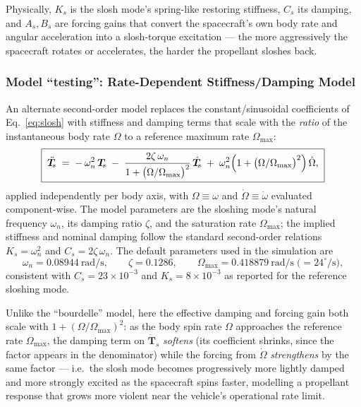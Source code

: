 Physically, $K_s$ is the slosh mode's spring-like restoring stiffness,
$C_s$ its damping, and $A_s, B_s$ are forcing gains that convert the
spacecraft's own body rate and angular acceleration into a slosh-torque
excitation --- the more aggressively the spacecraft rotates or
accelerates, the harder the propellant sloshes back.

\subsubsection{Model ``testing'': Rate-Dependent Stiffness/Damping Model}
\label{sec:slosh-testing}

An alternate second-order model replaces the constant/sinusoidal
coefficients of Eq.~\eqref{eq:slosh} with stiffness and damping terms that
scale with the \emph{ratio} of the instantaneous body rate $\Omega$ to a
reference maximum rate $\Omega_{\max}$:
\begin{equation}
\boxed{\;
\ddot{\bm{T}}_{\!s}
\;=\;
 -\,\omega_n^{2}\,\bm{T}_{\!s}
 \;-\;
 \frac{2\zeta\,\omega_n}{1+\bigl(\Omega/\Omega_{\max}\bigr)^{2}}\,
 \dot{\bm{T}}_{\!s}
 \;+\;
 \omega_n^{2}\Bigl(1+\bigl(\Omega/\Omega_{\max}\bigr)^{2}\Bigr)\,
 \dot{\Omega},
\;}
\label{eq:slosh-testing}
\end{equation}
applied independently per body axis, with $\Omega \equiv \omega$ and
$\dot\Omega \equiv \dot{\omega}$ evaluated component-wise. The model
parameters are the sloshing mode's natural frequency $\omega_n$, its
damping ratio $\zeta$, and the saturation rate $\Omega_{\max}$; the
implied stiffness and nominal damping follow the standard second-order
relations $K_s = \omega_n^{2}$ and $C_s = 2\zeta\,\omega_n$. The default
parameters used in the simulation are
\begin{equation}
\omega_n = 0.08944~\text{rad/s}, \qquad
\zeta = 0.1286, \qquad
\Omega_{\max} = 0.418879~\text{rad/s}
\;\bigl(=24^\circ/\text{s}\bigr),
\end{equation}
consistent with $C_s = 23\times10^{-3}$ and $K_s = 8\times10^{-3}$ as
reported for the reference sloshing mode.

Unlike the ``bourdelle'' model, here the effective damping and forcing
gain both scale with $1+(\Omega/\Omega_{\max})^{2}$: as the body spin rate
$\Omega$ approaches the reference rate $\Omega_{\max}$, the damping term
on $\dot{\bm{T}}_{\!s}$ \emph{softens} (its coefficient shrinks, since the
factor appears in the denominator) while the forcing from $\dot{\Omega}$
\emph{strengthens} by the same factor --- i.e.\ the slosh mode becomes
progressively more lightly damped and more strongly excited as the
spacecraft spins faster, modelling a propellant response that grows more
violent near the vehicle's operational rate limit.


